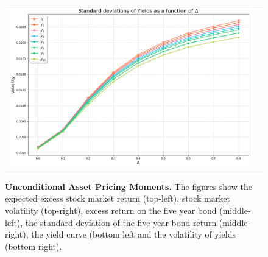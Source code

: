 \begin{figure}[htbp]
\begin{tabular}{cc}
\includegraphics[width=.4\textwidth]{figures/UnconditionalYieldVolatilitiesJFEALT.png} \\ 
\end{tabular}
\caption{\textbf{Unconditional Asset Pricing Moments.} \footnotesize{The figures show the expected excess stock market return (top-left), stock market volatility (top-right), excess return on the five year bond (middle-left), the standard deviation of the five year bond return (middle-right), the yield curve  (bottom left} and the volatility of yields (bottom right).}  \label{fig:UnconditionalAPALT} 
\end{figure}

